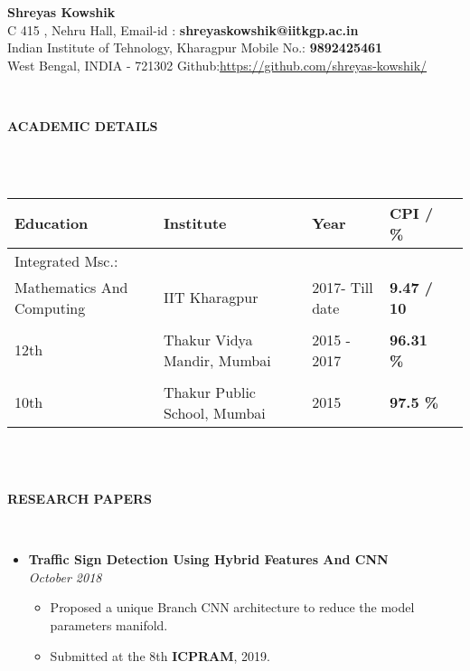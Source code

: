 \documentclass[a4paper,10pt]{article}
\newcommand{\lsep}{-0.5cm}
\newcommand{\resheading}[1]{{\small \colorbox{mygrey}{\begin{minipage}{0.975\textwidth}{\textbf{#1 \vphantom{p\^{E}}}}\end{minipage}}}}
\begin{document}
\begin{center}
\textbf{\Huge Shreyas Kowshik \\ }  
\indent \hfill \break
\indent C 415 , Nehru Hall, \hfill Email-id : \textbf{shreyaskowshik@iitkgp.ac.in} \\
\indent Indian Institute of Tehnology, Kharagpur \hfill Mobile No.: \textbf{9892425461} \\
\indent West Bengal, INDIA - 721302  \hfill Github:\url{https://github.com/shreyas-kowshik/} \\
\end{center}

\hspace{0.5cm}\\[-0.2cm]
\resheading{\textbf{ACADEMIC DETAILS} }\\[\lsep]
\\ 

\indent \begin{tabular}{ l @{\hskip 0.25in} l @{\hskip 0.25in} l @{\hskip 0.25in} l @{\hskip 0.25in} l }
\hline
\textbf{Education} & \textbf{Institute} & \textbf{Year} & \textbf{CPI / \%} \\
\hline
Integrated Msc.:\\
{Mathematics And Computing} & IIT Kharagpur  & 2017- Till date & \textbf{9.47 / 10} \\ \\
12th & Thakur Vidya Mandir, Mumbai & 2015 - 2017 & \textbf{96.31 \%}\\ \\
10th & Thakur Public School, Mumbai & 2015 & \textbf{97.5 \%}\\
\hline
\end{tabular}
\\ \hfill \break \\

\resheading{\textbf{RESEARCH PAPERS} }\\[\lsep]

\begin{itemize}
\item \textbf{Traffic Sign Detection Using Hybrid Features And CNN} \\
\emph{October 2018}
	\begin{itemize}
	\item Proposed a unique Branch CNN architecture to reduce the model parameters manifold.
	\item Submitted at the 8th \textbf{ICPRAM}, 2019.
	\end{itemize}
\end{itemize}
\end{document}
